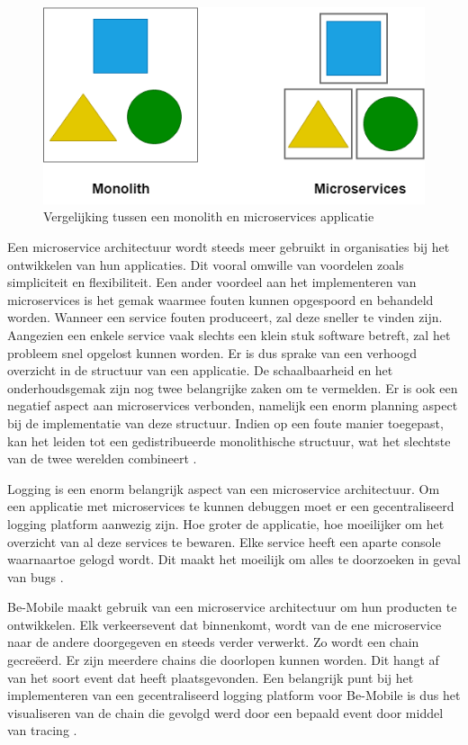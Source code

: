 \begin{figure}[ht]
    \centering
    \includegraphics[scale=0.6]{img/monolith-vs-micro}
    \caption[Vergelijking tussen een monolith en microservices applicatie]{Vergelijking tussen een monolith en microservices applicatie \cite{SourceFuse2018}}
\end{figure}

Een microservice architectuur wordt steeds meer gebruikt in organisaties bij het ontwikkelen van hun applicaties. Dit vooral omwille van voordelen zoals simpliciteit en flexibiliteit. Een ander voordeel aan het implementeren van microservices is het gemak waarmee fouten kunnen opgespoord en behandeld worden. Wanneer een service fouten produceert, zal deze sneller te vinden zijn. Aangezien een enkele service vaak slechts een klein stuk software betreft, zal het probleem snel opgelost kunnen worden. Er is dus sprake van een verhoogd overzicht in de structuur van een applicatie. De schaalbaarheid en het onderhoudsgemak zijn nog twee belangrijke zaken om te vermelden. Er is ook een negatief aspect aan microservices verbonden, namelijk een enorm planning aspect bij de implementatie van deze structuur. Indien op een foute manier toegepast, kan het leiden tot een gedistribueerde monolithische structuur, wat het slechtste van de twee werelden combineert \autocite{Carey2018}. 

Logging is een enorm belangrijk aspect van een microservice architectuur. Om een applicatie met microservices te kunnen debuggen moet er een gecentraliseerd logging platform aanwezig zijn. Hoe groter de applicatie, hoe moeilijker om het overzicht van al deze services te bewaren. Elke service heeft een aparte console waarnaartoe gelogd wordt. Dit maakt het moeilijk om alles te doorzoeken in geval van bugs \autocite{SourceFuse2018}. 

Be-Mobile maakt gebruik van een microservice architectuur om hun producten te ontwikkelen. Elk verkeersevent dat binnenkomt, wordt van de ene microservice naar de andere doorgegeven en steeds verder verwerkt. Zo wordt een chain gecreëerd. Er zijn meerdere chains die doorlopen kunnen worden. Dit hangt af van het soort event dat heeft plaatsgevonden. Een belangrijk punt bij het implementeren van een gecentraliseerd logging platform voor Be-Mobile is dus het visualiseren van de chain die gevolgd werd door een bepaald event door middel van tracing \autocite{jens2019}.

